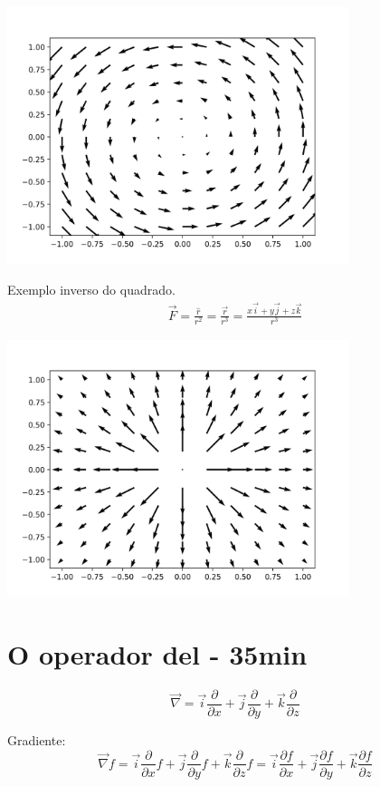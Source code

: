 \documentclass[a4paper,10pt]{article}
\begin{document}
 
 \begin{center}
 \includegraphics[width=10cm]{figs/exemplo_3_4_2.png}
 \end{center}

 \newpage

   Exemplo inverso do quadrado.
 \begin{eqnarray*}
  \vec{F}=\frac{\hat{r}}{r^2} =\frac{\vec{r}}{r^3}=\frac{x\vec{i}+y\vec{j}+z\vec{k}}{r^3}
 \end{eqnarray*}

 
 \begin{center}
 \includegraphics[width=10cm]{figs/campo_inv_q.png}
 \end{center}

 \section{O operador del - 35min}
 $$\vec{\nabla}=\vec{i}\frac{\partial}{\partial x}+\vec{j}\frac{\partial}{\partial y}+\vec{k}\frac{\partial}{\partial z}$$
 
 Gradiente:
 $$\vec{\nabla}f=\vec{i}\frac{\partial}{\partial x}f+\vec{j}\frac{\partial}{\partial y}f+\vec{k}\frac{\partial}{\partial z}f=\vec{i}\frac{\partial f}{\partial x}+\vec{j}\frac{\partial f}{\partial y}+\vec{k}\frac{\partial f}{\partial z}$$
 
\end{document}
